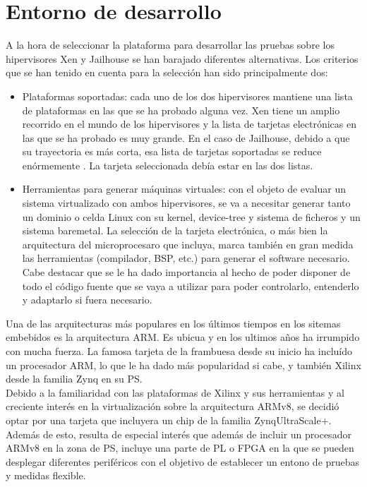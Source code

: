 \chapter{Entorno de desarrollo}

A la hora de seleccionar la plataforma para desarrollar las pruebas sobre los hipervisores Xen y Jailhouse se han barajado diferentes alternativas. Los criterios que se han tenido en cuenta para la selección han sido principalmente dos:
\begin{itemize}
  \item Plataformas soportadas: cada uno de los dos hipervisores mantiene una lista de plataformas en las que se ha probado alguna vez. Xen tiene un amplio recorrido en el mundo de los hipervisores y la lista de tarjetas electrónicas en las que se ha probado es muy grande. En el caso de Jailhouse, debido a que su trayectoria es más corta, esa lista de tarjetas soportadas se reduce enórmemente \cite{jailhouse_github}. La tarjeta seleccionada debía estar en las dos listas.
  \item Herramientas para generar máquinas virtuales: con el objeto de evaluar un sistema virtualizado con ambos hipervisores, se va a necesitar generar tanto un dominio o celda Linux con su kernel, device-tree y sistema de ficheros y un sistema baremetal. La selección de la tarjeta electrónica, o más bien la arquitectura del microprocesaro que incluya, marca también en gran medida las herramientas (compilador, BSP, etc.) para generar el software necesario. Cabe destacar que se le ha dado importancia al hecho de poder disponer de todo el código fuente que se vaya a utilizar para poder controlarlo, entenderlo y adaptarlo si fuera necesario.
\end{itemize}

Una de las arquitecturas más populares en los últimos tiempos en los sitemas embebidos es la arquitectura ARM. Es ubicua y en los ultimos años ha irrumpido con mucha fuerza. La famosa tarjeta de la frambuesa desde su inicio ha incluído un procesador ARM, lo que le ha dado más popularidad si cabe, y también Xilinx desde la familia Zynq en su PS.\\
Debido a la familiaridad con las plataformas de Xilinx y sus herramientas y al creciente interés en la virtualización sobre la arquitectura ARMv8, se decidió optar por una tarjeta que incluyera un chip de la familia Zynq\textregistered UltraScale+\texttrademark. Además de esto, resulta de especial interés que además de incluir un procesador ARMv8 en la zona de PS, incluye una parte de PL o FPGA en la que se pueden desplegar diferentes periféricos con el objetivo de establecer un entono de pruebas y medidas flexible.

